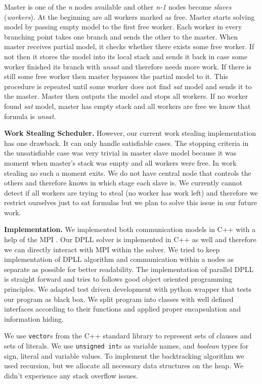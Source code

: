 \documentclass[letterpaper]{article}
\newcommand{\mypar}[1]{{\bf #1.}}
\begin{document}
Master is one of the \textit{n} nodes available and other \textit{n-1} nodes become \textit{slaves} (\textit{workers}). At the beginning are all workers marked as free. Master starts solving model by passing empty model to the first free worker. Each worker in every branching point takes one branch and sends the other to the master. When master receives partial model, it checks whether there exists some free worker. If not then it stores the model into its local stack and sends it back in case some worker finished its branch with \textit{unsat} and therefore needs more work. If there is still some free worker then master bypasses the partial model to it. This procedure is repeated until some worker does not find \textit{sat} model and sends it to the master. Master then outputs the model and stops all workers. If no worker found \textit{sat} model, master has empty stack and all workers are free we know that formula is \textit{unsat}.

\mypar{Work Stealing Scheduler}
However, our current work stealing implementation has one drawback. It can only handle satisfiable cases. The stopping criteria in the unsatisfiable case was very trivial in master slave model because it was moment when master's stack was empty and all workers were free. In work stealing no such a moment exits. We do not have central node that controls the others and therefore knows in which stage each slave is. We currently cannot detect if all workers are trying to steal (no worker has work left) and therefore we restrict ourselves just to sat formulas but we plan to solve this issue in our future work. 

\mypar{Implementation}
We implemented both communication models in C++ with a help of the MPI \cite{mpi}.
Our DPLL solver is implemented in C++ as well and therefore we can directly interact with MPI within the solver. We tried to keep implementation of DPLL algorithm and communication within a nodes as separate as possible for better readability.
The implementation of parallel DPLL is straight forward and tries to follows good object oriented programming principles. We adapted test driven development with python wrapper that tests our program as black box. We split program into classes with well defined interfaces according to their functions and applied proper encapsulation and information hiding. 

We use \texttt{vector}s from the C++ standard library to represent sets of clauses and sets of literals. We use \texttt{unsigned int}s as variable names, and \textit{boolean} types for sign, literal and variable values. 
To implement the backtracking algorithm we used recursion, but we allocate all necessary data structures on the heap.
We didn't experience any stack overflow issues.
\end{document}
